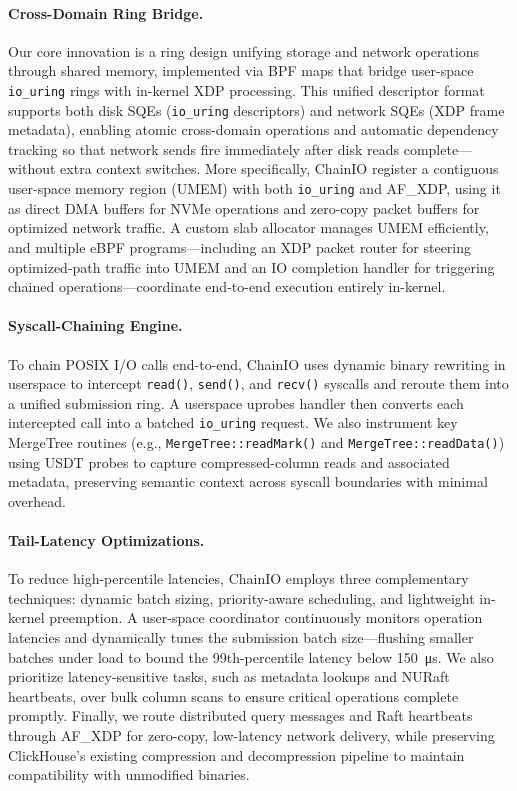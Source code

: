 \documentclass[sigconf,10pt]{acmart}
\newcommand{\sys}{ChainIO\xspace}
\begin{document}
\paragraph{Cross-Domain Ring Bridge.} Our core innovation is a ring design unifying storage and network operations through shared memory, implemented via BPF maps that bridge user-space \texttt{io\_uring} rings with in-kernel XDP processing. This unified descriptor format supports both disk SQEs (\texttt{io\_uring} descriptors) and network SQEs (XDP frame metadata), enabling atomic cross-domain operations and automatic dependency tracking so that network sends fire immediately after disk reads complete—without extra context switches. More specifically, \sys register a contiguous user-space memory region (UMEM) with both \texttt{io\_uring} and AF\_XDP, using it as direct DMA buffers for NVMe operations and zero-copy packet buffers for optimized network traffic. A custom slab allocator manages UMEM efficiently, and multiple eBPF programs—including an XDP packet router for steering optimized-path traffic into UMEM and an IO completion handler for triggering chained operations—coordinate end-to-end execution entirely in-kernel.


\paragraph{Syscall-Chaining Engine.} To chain POSIX I/O calls end-to-end, \sys uses dynamic binary rewriting in userspace to intercept \texttt{read()}, \texttt{send()}, and \texttt{recv()} syscalls and reroute them into a unified submission ring. A userspace uprobes\cite{zheng2023bpftime} handler then converts each intercepted call into a batched \texttt{io\_uring} request. We also instrument key MergeTree routines (e.g., \texttt{MergeTree::readMark()} and \texttt{MergeTree::readData()}) using USDT probes to capture compressed-column reads and associated metadata, preserving semantic context across syscall boundaries with minimal overhead.

\paragraph{Tail-Latency Optimizations.} To reduce high-percentile latencies, \sys employs three complementary techniques: dynamic batch sizing, priority-aware scheduling, and lightweight in-kernel preemption. A user-space coordinator continuously monitors operation latencies and dynamically tunes the submission batch size—flushing smaller batches under load to bound the 99th-percentile latency below \SI{150}{\micro\second}. We also prioritize latency-sensitive tasks, such as metadata lookups and NURaft heartbeats, over bulk column scans to ensure critical operations complete promptly. Finally, we route distributed query messages and Raft heartbeats through AF\_XDP for zero-copy, low-latency network delivery, while preserving ClickHouse's existing compression and decompression pipeline to maintain compatibility with unmodified binaries.
\end{document}
